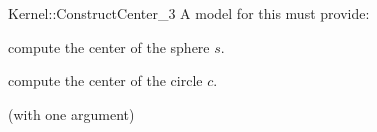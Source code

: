 \begin{ccRefFunctionObjectConcept}{Kernel::ConstructCenter_3}
A model for this must provide:


 {compute the center of the sphere $s$.}

 {compute the center of the circle $c$.}

\ccRefines
{} (with one argument)

\ccSeeAlso
{}  \\

\end{ccRefFunctionObjectConcept}
